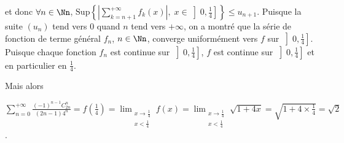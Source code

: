 {{et donc $\forall n\in\Nn$, $\text{Sup}\left\{\left|\sum_{k=n+1}^{+\infty}f_k(x)\right|,\;x\in\left]0, \frac{1}{4}\right]\right\}\leqslant u_{n+1}$. Puisque la suite $(u_n)$ tend vers $0$ quand $n$ tend vers $+\infty$, on a montré que la série de fonction de terme général $f_n$, $n\in\Nn$, converge uniformément vers $f$ sur $\left]0, \frac{1}{4}\right]$. Puisque chaque fonction $f_n$ est continue sur $\left]0, \frac{1}{4}\right]$, $f$ est continue sur $\left]0, \frac{1}{4}\right]$ et en particulier en $ \frac{1}{4}$.

Mais alors

\begin{center}
$\sum_{n=0}^{+\infty} \frac{(-1)^{n-1}C_{2n}^n}{(2n-1)4^n}=f\left( \frac{1}{4}\right)=\displaystyle\lim_{\substack{x\rightarrow\frac{1}{4}\\
x<\frac{1}{4}}}f(x)=\displaystyle\lim_{\substack{x\rightarrow\frac{1}{4}\\
x<\frac{1}{4}}}\sqrt{1+4x}=\sqrt{1+4\times \frac{1}{4}}=\sqrt{2}$.
\end{center}

\begin{center}
\end{center}
}
}
